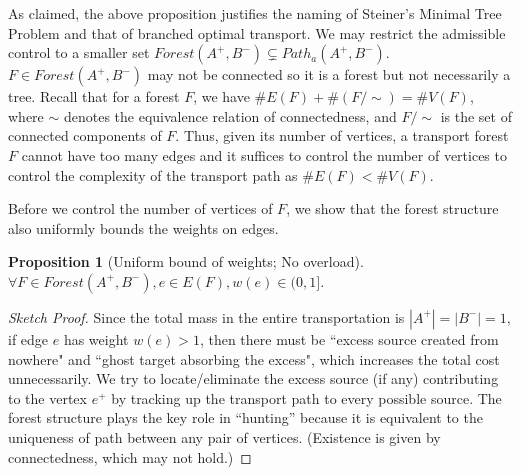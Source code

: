 \documentclass[fleqn]{article}
\newtheorem{prop}[thm]{Proposition}
\theoremstyle{definition}
\theoremstyle{remark}
\begin{document}
As claimed, the above proposition justifies the naming of Steiner's Minimal Tree Problem and that of branched optimal transport. We may restrict the admissible control to a smaller set $Forest(A^+,B^-) \subsetneq Path_a(A^+,B^-)$. $F\in Forest(A^+,B^-)$ may not be connected so it is a forest but not necessarily a tree. Recall that for a forest $F$, we have $\#E(F) + \#(F\slash\sim) = \#V(F)$, where $\sim$ denotes the equivalence relation of connectedness, and $F\slash\sim$ is the set of connected components of $F$. Thus, given its number of vertices, a transport forest $F$ cannot have too many edges and it suffices to control the number of vertices to control the complexity of the transport path as $\#E(F) < \#V(F)$.

\par
Before we control the number of vertices of $F$, we show that the forest structure also uniformly bounds the weights on edges.
\begin{prop}[Uniform bound of weights; No overload]
$\forall F\in Forest(A^+,B^-), e\in E(F), w(e)\in (0,1]$.
\end{prop}

\begin{proof}[Sketch Proof]\let\qed\relax
Since the total mass in the entire transportation is $|A^+|=|B^-|=1$, if edge $e$ has weight $w(e)>1$, then there must be ``excess source created from nowhere" and ``ghost target absorbing the excess", which increases the total cost unnecessarily. We try to locate/eliminate the excess source (if any) contributing to the vertex $e^+$ by tracking up the transport path to every possible source. The forest structure plays the key role in ``hunting'' because it is equivalent to the uniqueness of path between any pair of vertices. (Existence is given by connectedness, which may not hold.)
\end{proof}
\end{document}

